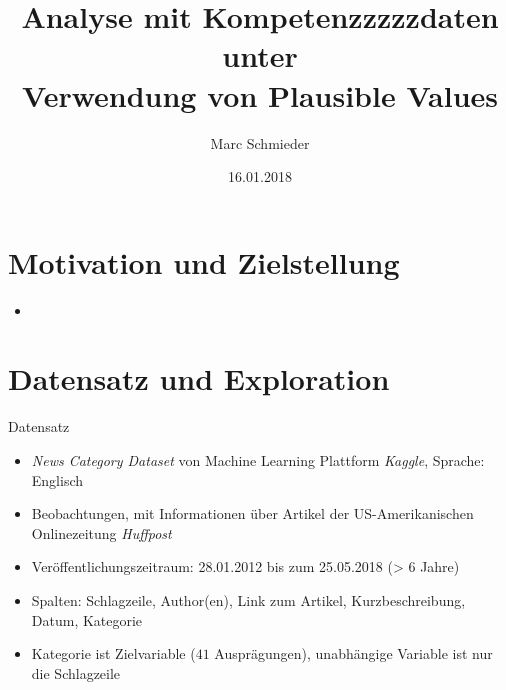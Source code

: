 \documentclass[10pt, xcolor = dvipsnames]{beamer}
\title{Analyse mit Kompetenzzzzzdaten unter \\
Verwendung von Plausible Values}        %
\author{Marc Schmieder}     %
\date{16.01.2018}                     %
\subtitle{}  %
\institute{TU Dortmund} %
\begin{document}

\begin{frame}                     %
 \maketitle                       %
\end{frame}



\tableofcontents

\section{Motivation und Zielstellung}

\begin{frame}{\insertsection}

   \begin{itemize}
   \item 
   \end{itemize}
\end{frame}  


\section{Datensatz und Exploration}

\begin{frame}{Datensatz}

   \begin{itemize}
   \item \textit{News Category Dataset} von Machine Learning Plattform \textit{Kaggle}, Sprache: Englisch
   \item {} Beobachtungen, mit Informationen  über Artikel der US-Amerikanischen Onlinezeitung \textit{Huffpost}
   \item  Veröffentlichungszeitraum: 28.01.2012 bis zum 25.05.2018 (> $6$ Jahre)
   \item Spalten: Schlagzeile, Author(en), Link zum Artikel, Kurzbeschreibung, Datum, Kategorie
   \item Kategorie ist Zielvariable ($41$ Ausprägungen), unabhängige Variable ist nur die Schlagzeile
   \end{itemize}

\end{frame}

 
\end{document}
